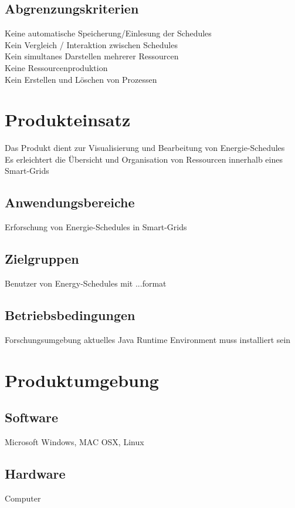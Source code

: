 \documentclass[parskip=full]{scrartcl}
\begin{document}
		\subsection{Abgrenzungskriterien}
			Keine automatische Speicherung/Einlesung der Schedules\\
			Kein Vergleich / Interaktion zwischen Schedules\\
			Kein simultanes Darstellen mehrerer Ressourcen\\
			Keine Ressourcenproduktion\\
			Kein Erstellen und Löschen von Prozessen\\
			
			
	\section{Produkteinsatz}
		Das Produkt dient zur Visualisierung und Bearbeitung von Energie-Schedules\\
		Es erleichtert die Übersicht und Organisation von Ressourcen innerhalb eines Smart-Grids\\
		\subsection{Anwendungsbereiche}
			Erforschung von Energie-Schedules in Smart-Grids\\
			
		\subsection{Zielgruppen}
			Benutzer von Energy-Schedules mit ...format\\
			
		\subsection{Betriebsbedingungen}
			Forschungsumgebung aktuelles Java Runtime Environment muss installiert sein\\
			
	\section{Produktumgebung}
		\subsection{Software}
			Microsoft Windows, MAC OSX, Linux
		\subsection{Hardware}
		Computer\\
\end{document}

